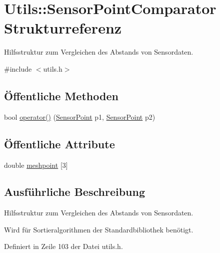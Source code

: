\hypertarget{structUtils_1_1SensorPointComparator}{\section{Utils\-:\-:Sensor\-Point\-Comparator Strukturreferenz}
\label{structUtils_1_1SensorPointComparator}
}


Hilfsstruktur zum Vergleichen des Abstands von Sensordaten.  




{\ttfamily \#include $<$utils.\-h$>$}

\subsection*{Öffentliche Methoden}
\begin{DoxyCompactItemize}
\item 
bool \hyperlink{structUtils_1_1SensorPointComparator_a92795eac49f9ea851c04a623c5a3d6b6}{operator()} (\hyperlink{structUtils_1_1SensorPoint}{Sensor\-Point} p1, \hyperlink{structUtils_1_1SensorPoint}{Sensor\-Point} p2)
\end{DoxyCompactItemize}
\subsection*{Öffentliche Attribute}
\begin{DoxyCompactItemize}
\item 
double \hyperlink{structUtils_1_1SensorPointComparator_a51335aca914559e34d9202b67d90b143}{meshpoint} \mbox{[}3\mbox{]}
\end{DoxyCompactItemize}


\subsection{Ausführliche Beschreibung}
Hilfsstruktur zum Vergleichen des Abstands von Sensordaten. 

Wird für Sortieralgorithmen der Standardbibliothek benötigt. 

Definiert in Zeile 103 der Datei utils.\-h.



